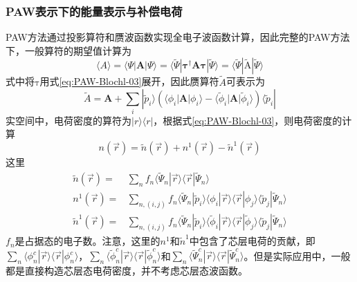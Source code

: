 \subsubsection{PAW表示下的能量表示与补偿电荷}
\textrm{PAW}方法通过投影算符和赝波函数实现全电子波函数计算，因此完整的\textrm{PAW}方法下，一般算符的期望值计算为
\begin{equation}
	\langle A \rangle=\langle\Psi|\mathbf{A}|\Psi\rangle=\langle\tilde\Psi|\mathbf{\tau}^{\dag}\mathbf{A}\mathbf{\tau}|\tilde\Psi\rangle=\langle\tilde\Psi|\tilde{\mathrm{A}}|\tilde\Psi\rangle
	\label{eq:PAW-Blochl-04}
\end{equation}
式中将$\mathrm{\tau}$用式\eqref{eq:PAW-Blochl-03}展开，因此赝算符$\tilde A$可表示为
\begin{equation}
	\tilde A=\mathbf{A}+\sum_i|\tilde p_i\rangle(\langle\phi_i|\mathbf{A}|\phi_i\rangle-\langle\tilde\phi_i|\mathbf{A}|\tilde\phi_i\rangle)\langle\tilde p_i|
	\label{eq:PAW-Blochl-05}
\end{equation}
实空间中，电荷密度的算符为$|r\rangle\langle r|$，根据式\eqref{eq:PAW-Blochl-03}，则电荷密度的计算
\begin{equation}
	n(\vec r)=\tilde n(\vec r)+n^1(\vec r)-\tilde n^1(\vec r)
	\label{eq:PAW-Blochl-07}
\end{equation}
这里
\begin{displaymath}
	\begin{aligned}
		\tilde n(\vec r)=&\sum_nf_n\langle\tilde\Psi_n|\vec r\rangle\langle\vec r|\tilde\Psi_n\rangle \\
n^1(\vec r)=&\sum_{n,(i,j)}f_n\langle\tilde\Psi_n|\tilde p_i\rangle\langle\phi_i|\vec r\rangle\langle\vec r|\phi_j\rangle\langle\tilde p_j|\tilde\Psi_n\rangle \\
\tilde n^1(\vec r)=&\sum_{n,(i,j)}f_n\langle\tilde\Psi_n|\tilde p_i\rangle\langle\tilde\phi_i|\vec r\rangle\langle\vec r|\tilde\phi_j\rangle\langle\tilde p_j|\tilde\Psi_n\rangle
	\end{aligned}
\end{displaymath}
$f_n$是占据态的电子数。注意，这里的$n^1$和$\tilde n^1$中包含了芯层电荷的贡献，即$\sum_n\langle\phi_n^c|\vec r\rangle\langle\vec r|\phi_n^c\rangle$，$\sum_n\langle\tilde\phi_n^c|\vec r\rangle\langle\vec r|\tilde\phi_n^c\rangle$和$\sum_n\langle\tilde\Psi_n^c|\vec r\rangle\langle\vec r|\tilde\Psi_n^c\rangle$。但是实际应用中，一般都是直接构造芯层态电荷密度，并不考虑芯层态波函数。

